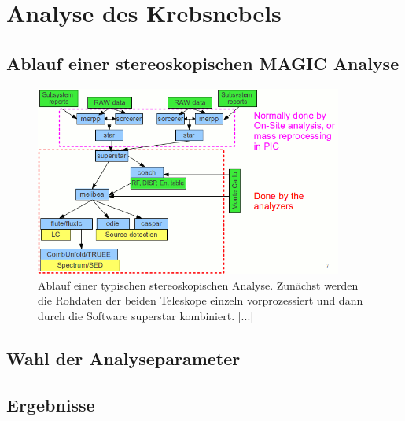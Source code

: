 \section{Analyse des Krebsnebels}
\label{sec:analyse}

\subsection{Ablauf einer stereoskopischen MAGIC Analyse}

\begin{figure}
  \centering
  \includegraphics[width=0.9\textwidth]{figures/analysischain.png}
  \caption{Ablauf einer typischen stereoskopischen Analyse. Zunächst werden die
  Rohdaten der beiden Teleskope einzeln vorprozessiert und dann durch die
  Software superstar kombiniert. [...]}
  \label{fig:analysis_chain}
\end{figure}

\subsection{Wahl der Analyseparameter}

\subsection{Ergebnisse}

